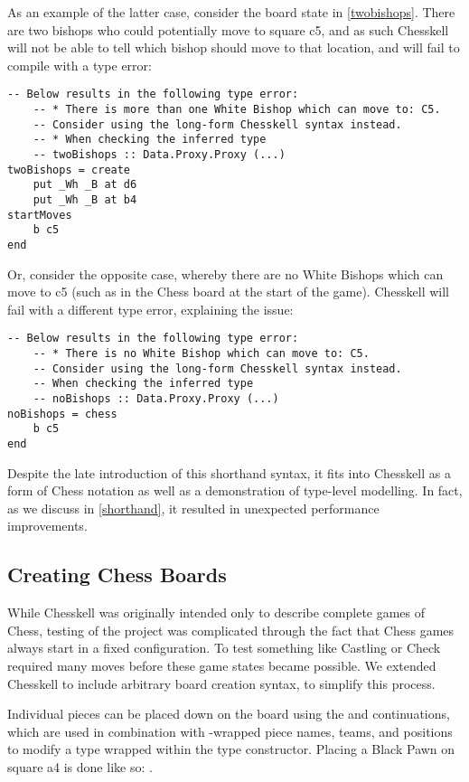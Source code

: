 As an example of the latter case, consider the board state in \cref{twobishops}. There are two bishops who could potentially move to square c5, and as such Chesskell will not be able to tell which bishop should move to that location, and will fail to compile with a type error:

\begin{lstlisting}
-- Below results in the following type error:
    -- * There is more than one White Bishop which can move to: C5.
    -- Consider using the long-form Chesskell syntax instead.
    -- * When checking the inferred type
    -- twoBishops :: Data.Proxy.Proxy (...)
twoBishops = create
    put _Wh _B at d6
    put _Wh _B at b4
startMoves
    b c5
end
\end{lstlisting}

Or, consider the opposite case, whereby there are no White Bishops which can move to c5 (such as in the Chess board at the start of the game). Chesskell will fail with a different type error, explaining the issue:

\begin{lstlisting}
-- Below results in the following type error:
    -- * There is no White Bishop which can move to: C5.
    -- Consider using the long-form Chesskell syntax instead.
    -- When checking the inferred type
    -- noBishops :: Data.Proxy.Proxy (...)
noBishops = chess
    b c5
end
\end{lstlisting}

Despite the late introduction of this shorthand syntax, it fits into Chesskell as a form of Chess notation as well as a demonstration of type-level modelling. In fact, as we discuss in \cref{shorthand}, it resulted in unexpected performance improvements.

\subsection{Creating Chess Boards} \label{boardcreation}

While Chesskell was originally intended only to describe complete games of Chess, testing of the project was complicated through the fact that Chess games always start in a fixed configuration. To test something like Castling or Check required many moves before these game states became possible. We extended Chesskell to include arbitrary board creation syntax, to simplify this process.

Individual pieces can be placed down on the board using the  and  continuations, which are used in combination with -wrapped piece names, teams, and positions to modify a  type wrapped within the  type constructor. Placing a Black Pawn on square a4 is done like so: .

